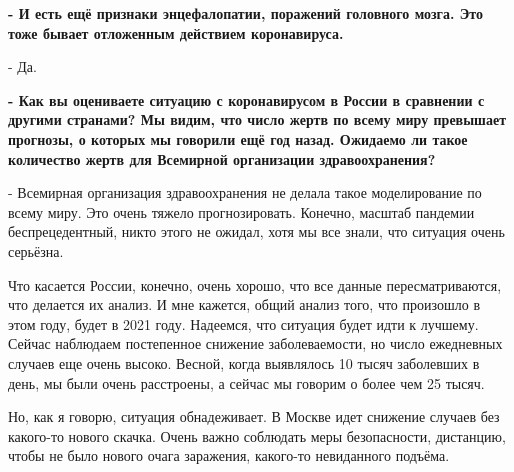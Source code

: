 \textbf{- И есть ещё признаки энцефалопатии, поражений головного мозга. Это тоже бывает
отложенным действием коронавируса.}

- Да.

\textbf{- Как вы оцениваете ситуацию с коронавирусом в России в сравнении с другими
странами? Мы видим, что число жертв по всему миру превышает прогнозы, о которых
мы говорили ещё год назад. Ожидаемо ли такое количество жертв для Всемирной
организации здравоохранения?}

- Всемирная организация здравоохранения не делала такое моделирование по всему
миру. Это очень тяжело прогнозировать. Конечно, масштаб пандемии
беспрецедентный, никто этого не ожидал, хотя мы все знали, что ситуация очень
серьёзна.

Что касается России, конечно, очень хорошо, что все данные пересматриваются,
что делается их анализ. И мне кажется, общий анализ того, что произошло в этом
году, будет в 2021 году. Надеемся, что ситуация будет идти к лучшему. Сейчас
наблюдаем постепенное снижение заболеваемости, но число ежедневных случаев еще
очень высоко. Весной, когда выявлялось 10 тысяч заболевших в день, мы были
очень расстроены, а сейчас мы говорим о более чем 25 тысяч.

Но, как я говорю, ситуация обнадеживает. В Москве идет снижение случаев без
какого-то нового скачка. Очень важно соблюдать меры безопасности, дистанцию,
чтобы не было нового очага заражения, какого-то невиданного подъёма.

